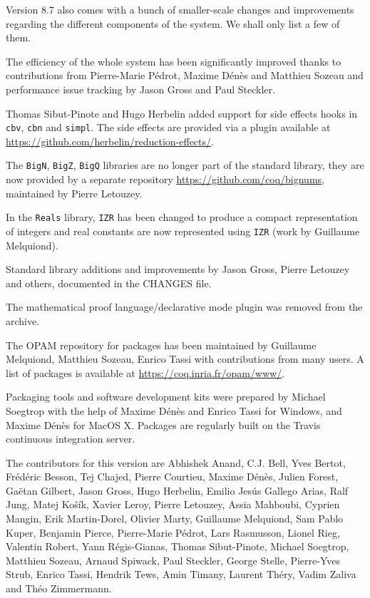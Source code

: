 Version 8.7 also comes with a bunch of smaller-scale changes and improvements
regarding the different components of the system. We shall only list a
few of them.

The efficiency of the whole system has been significantly improved
thanks to contributions from Pierre-Marie Pédrot, Maxime Dénès and
Matthieu Sozeau and performance issue tracking by Jason Gross and Paul
Steckler.

Thomas Sibut-Pinote and Hugo Herbelin added support for side effects
hooks in \texttt{cbv}, \texttt{cbn} and \texttt{simpl}.  The side
effects are provided via a plugin available at
\url{https://github.com/herbelin/reduction-effects/}.

The \texttt{BigN}, \texttt{BigZ}, \texttt{BigQ} libraries are no longer
part of the {\Coq} standard library, they are now provided by a separate
repository \url{https://github.com/coq/bignums}, maintained by Pierre
Letouzey.

In the \texttt{Reals} library, \texttt{IZR} has been changed to produce
a compact representation of integers and real constants are now
represented using \texttt{IZR} (work by Guillaume Melquiond).

Standard library additions and improvements by Jason Gross, Pierre
Letouzey and others, documented in the CHANGES file.

The mathematical proof language/declarative mode plugin was removed from
the archive.

The OPAM repository for {\Coq} packages has been maintained by Guillaume
Melquiond, Matthieu Sozeau, Enrico Tassi with contributions from many
users. A list of packages is available at
\url{https://coq.inria.fr/opam/www/}.

Packaging tools and software development kits were prepared by Michael
Soegtrop with the help of Maxime Dénès and Enrico Tassi for Windows, and
Maxime Dénès for MacOS X. Packages are regularly built on the
Travis continuous integration server.

The contributors for this version are Abhishek Anand, C.J. Bell, Yves
Bertot, Frédéric Besson, Tej Chajed, Pierre Courtieu, Maxime Dénès,
Julien Forest, Gaëtan Gilbert, Jason Gross, Hugo Herbelin, Emilio Jesús
Gallego Arias, Ralf Jung, Matej Košík, Xavier Leroy, Pierre Letouzey,
Assia Mahboubi, Cyprien Mangin, Erik Martin-Dorel, Olivier Marty,
Guillaume Melquiond, Sam Pablo Kuper, Benjamin Pierce, Pierre-Marie
Pédrot, Lars Rasmusson, Lionel Rieg, Valentin Robert, Yann Régis-Gianas,
Thomas Sibut-Pinote, Michael Soegtrop, Matthieu Sozeau, Arnaud Spiwack,
Paul Steckler, George Stelle, Pierre-Yves Strub, Enrico Tassi, Hendrik
Tews, Amin Timany, Laurent Théry, Vadim Zaliva and Théo Zimmermann.

